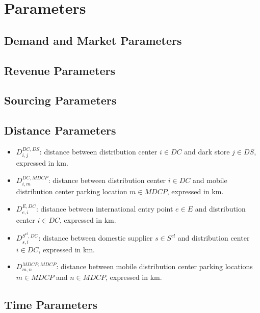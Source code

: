 \documentclass[12pt]{article}
\begin{document}
\section{Parameters}

\subsection{Demand and Market Parameters}

\subsection{Revenue Parameters}

\subsection{Sourcing Parameters}

\subsection{Distance Parameters}

\begin{itemize}
    \item $D^{DC,DS}_{i,j}$: distance between distribution center $i \in DC$ and dark store $j \in DS$, expressed in km.

    \item $D^{DC,MDCP}_{i,m}$: distance between distribution center $i \in DC$ and mobile distribution center parking location $m \in MDCP$, expressed in km.

    \item $D^{E,DC}_{e,i}$: distance between international entry point $e \in E$ and distribution center $i \in DC$, expressed in km.

    \item $D^{S^{cl},DC}_{s,i}$: distance between domestic supplier $s \in S^{cl}$ and distribution center $i \in DC$, expressed in km.

    \item $D^{MDCP,MDCP}_{m,n}$: distance between mobile distribution center parking locations $m \in MDCP$ and $n \in MDCP$, expressed in km.
\end{itemize}

\subsection{Time Parameters}
\end{document}
